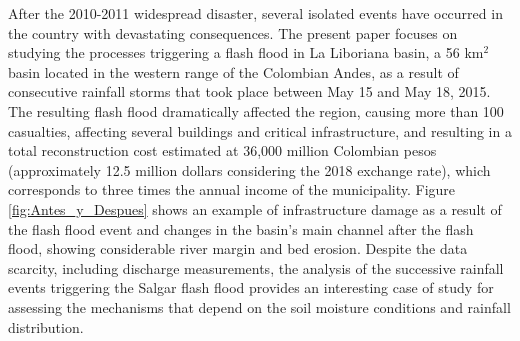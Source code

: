 \documentclass[hess, manuscript]{copernicus}
\begin{document}
After the  2010-2011 widespread disaster, several isolated events have occurred in the country with devastating consequences. The present paper focuses on studying the processes triggering a flash flood in La Liboriana basin, a 56 km$^2$ basin located in the western range of the Colombian Andes, as a result of consecutive rainfall storms that took place between May 15 and May 18, 2015. The resulting flash flood dramatically affected the region, causing more than 100 casualties, affecting several buildings and critical infrastructure, and resulting in a total reconstruction cost estimated at 36,000 million Colombian pesos (approximately 12.5 million dollars considering the 2018 exchange rate), which corresponds to three times the annual income of the municipality. Figure \ref{fig:Antes_y_Despues} shows an example of infrastructure damage as a result of the flash flood event and changes in the basin's main channel after the flash flood, showing considerable river margin and bed erosion. Despite the data scarcity, including discharge measurements, the analysis of the successive rainfall events triggering the Salgar flash flood provides an interesting case of study for assessing the mechanisms that depend on the soil moisture conditions and rainfall distribution.\\
\end{document}
